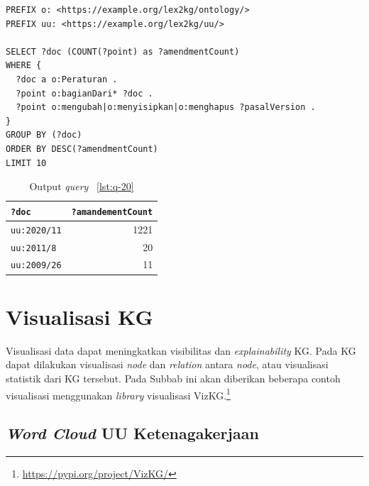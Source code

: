 \begin{listing}[H]
  \begin{verbatim}
PREFIX o: <https://example.org/lex2kg/ontology/>
PREFIX uu: <https://example.org/lex2kg/uu/>

SELECT ?doc (COUNT(?point) as ?amendmentCount)
WHERE {
  ?doc a o:Peraturan .
  ?point o:bagianDari* ?doc .
  ?point o:mengubah|o:menyisipkan|o:menghapus ?pasalVersion .
}
GROUP BY (?doc)
ORDER BY DESC(?amendmentCount)
LIMIT 10
  \end{verbatim}
  \caption{SPARQL \textit{query} untuk \textit{competency question} No. 20}
  \label{lst:q-20}
\end{listing}

\begin{table}
  \centering
  \begin{tabular}{|l|r|} \hline
    \texttt{?doc}       & \texttt{?amandementCount} \\\hline \hline
    \texttt{uu:2020/11} & 1221                      \\\hline
    \texttt{uu:2011/8}  & 20                        \\\hline
    \texttt{uu:2009/26} & 11                        \\\hline
  \end{tabular}
  \caption{Output \textit{query} \lst~\ref{lst:q-20} }
  \label{tab:output-q-20}
\end{table}

\section{Visualisasi KG}
\label{sec:visualisasi-kg}

Visualisasi data dapat meningkatkan visibilitas dan \textit{explainability} KG. Pada KG dapat
dilakukan visualisasi \textit{node} dan \textit{relation} antara \textit{node}, atau visualisasi
statistik dari KG tersebut. Pada Subbab ini akan diberikan beberapa contoh visualisasi menggunakan
\textit{library} visualisasi VizKG.\footnote{\url{https://pypi.org/project/VizKG/}}

\subsection{\textit{Word Cloud} UU Ketenagakerjaan}
\label{subsec:word-cloud}

